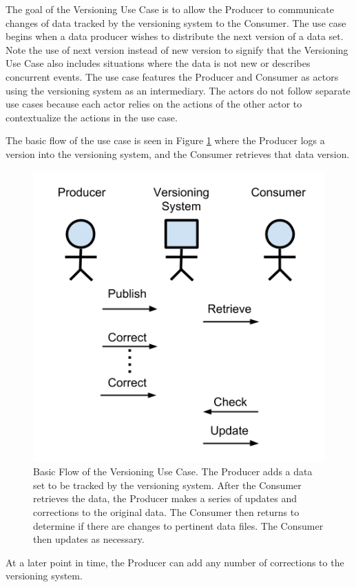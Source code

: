 The goal of the Versioning Use Case is to allow the Producer to communicate changes of data tracked by the versioning system to the Consumer.
The use case begins when a data producer wishes to distribute the next \gls{version} of a data set.
Note the use of next \gls{version} instead of new \gls{version} to signify that the Versioning Use Case also includes situations where the data is not new or describes concurrent events.
The use case features the Producer and Consumer as actors using the versioning system as an intermediary.
The actors do not follow separate use cases because each actor relies on the actions of the other actor to contextualize the actions in the use case.

The basic flow of the use case is seen in Figure \ref{UCD1} where the Producer logs a version into the versioning system, and the Consumer retrieves that data version.
\begin{figure}
	\centering
	\includegraphics[scale=1]{figures/UC_Diagram1.png}
	\caption[Versioning Use Case Basic Flow]{Basic Flow of the Versioning Use Case.  The Producer adds a data set to be tracked by the versioning system.  After the Consumer retrieves the data, the Producer makes a series of updates and corrections to the original data.  The Consumer then returns to determine if there are changes to pertinent data files.  The Consumer then updates as necessary.}
	\label{UCD1}
\end{figure}
At a later point in time, the Producer can add any number of corrections to the versioning system.

